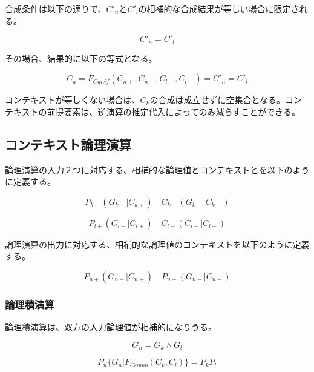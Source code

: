 \documentclass[12pt]{article}
\begin{document}
合成条件は以下の通りで、\(C'_n\)と\(C'_l\)の相補的な合成結果が等しい場合に限定される。

\begin{equation} C'_{n} = C'_{l}\end{equation}

その場合、結果的に以下の等式となる。

\begin{equation} C_{k} = F_{Cunif}(C_{n+},C_{n-},C_{l+},C_{l-}) = C'_{n} = C'_{l} \end{equation}

コンテキストが等しくない場合は、\(C_{k}\)の合成は成立せずに空集合となる。コンテキストの前提要素は、逆演算の推定代入によってのみ減らすことができる。

\subsection{コンテキスト論理演算}\label{ux30b3ux30f3ux30c6ux30adux30b9ux30c8ux8ad6ux7406ux6f14ux7b97}

論理演算の入力２つに対応する、相補的な論理値とコンテキストとを以下のように定義する。

\begin{equation} P_{k+}(G_{k+}|C_{k+}) \quad C_{k-}(G_{k-}|C_{k-}) \end{equation}

\begin{equation} P_{l+}(G_{l+}|C_{l+}) \quad C_{l-}(G_{l-}|C_{l-})\end{equation}

論理演算の出力に対応する、相補的な論理値のコンテキストを以下のように定義する。

\begin{equation} P_{n+}(G_{n+}|C_{n+}) \quad P_{n-}(G_{n-}|C_{n-})\end{equation}

\subsubsection{論理積演算}\label{ux8ad6ux7406ux7a4dux6f14ux7b97}

論理積演算は、双方の入力論理値が相補的になりうる。

\begin{equation} G_n =G_k \wedge G_l\end{equation}

\begin{equation} P_{n}\{G_n|F_{Ccomb}(C_{k},C_{l})\}=P_{k}P_{l}\end{equation}
\end{document}
